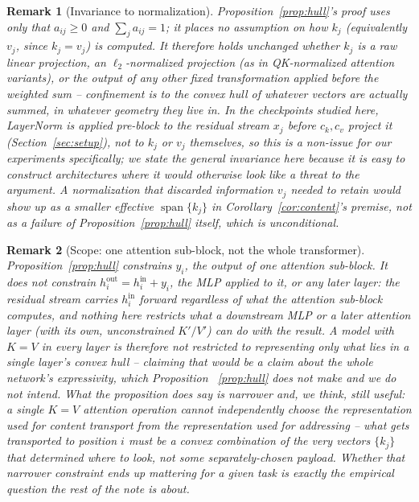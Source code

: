 \documentclass[11pt]{article}
\newtheorem{remark}{Remark}
\begin{document}
\begin{remark}[Invariance to normalization]
\label{rem:norm}
Proposition~\ref{prop:hull}'s proof uses only that $a_{ij}\ge 0$ and $\sum_j a_{ij}=1$;
it places no assumption on how $k_j$ (equivalently $v_j$, since $k_j=v_j$) is
computed. It therefore holds unchanged whether $k_j$ is a raw linear projection, an
$\ell_2$-normalized projection (as in QK-normalized attention variants), or the output
of any other fixed transformation applied before the weighted sum -- confinement is to
the convex hull of whatever vectors are actually summed, in whatever geometry they
live in. In the checkpoints studied here, LayerNorm is applied pre-block to the
residual stream $x_j$ before $c_k, c_v$ project it (Section~\ref{sec:setup}), not to
$k_j$ or $v_j$ themselves, so this is a non-issue for our experiments specifically; we
state the general invariance here because it is easy to construct architectures where
it would otherwise look like a threat to the argument. A normalization that discarded
information $v_j$ needed to retain would show up as a smaller effective
$\operatorname{span}\{k_j\}$ in Corollary~\ref{cor:content}'s premise, not as a failure
of Proposition~\ref{prop:hull} itself, which is unconditional.
\end{remark}

\begin{remark}[Scope: one attention sub-block, not the whole transformer]
\label{rem:scope}
Proposition~\ref{prop:hull} constrains $y_i$, the output of one attention sub-block.
It does not constrain $h_i^{\text{out}} = h_i^{\text{in}} + y_i$, the MLP applied to
it, or any later layer: the residual stream carries $h_i^{\text{in}}$ forward
regardless of what the attention sub-block computes, and nothing here restricts what
a downstream MLP or a later attention layer (with its own, unconstrained $K'/V'$) can
do with the result. A model with $K=V$ in every layer is therefore \emph{not}
restricted to representing only what lies in a single layer's convex hull -- claiming
that would be a claim about the whole network's expressivity, which Proposition~
\ref{prop:hull} does not make and we do not intend. What the proposition does say is
narrower and, we think, still useful: a single $K=V$ attention operation cannot
independently choose the representation used for content transport from the
representation used for addressing -- what gets transported to position $i$ must be a
convex combination of the very vectors $\{k_j\}$ that determined \emph{where} to look,
not some separately-chosen payload. Whether that narrower constraint ends up
mattering for a given task is exactly the empirical question the rest of the note is
about.
\end{remark}
\end{document}
